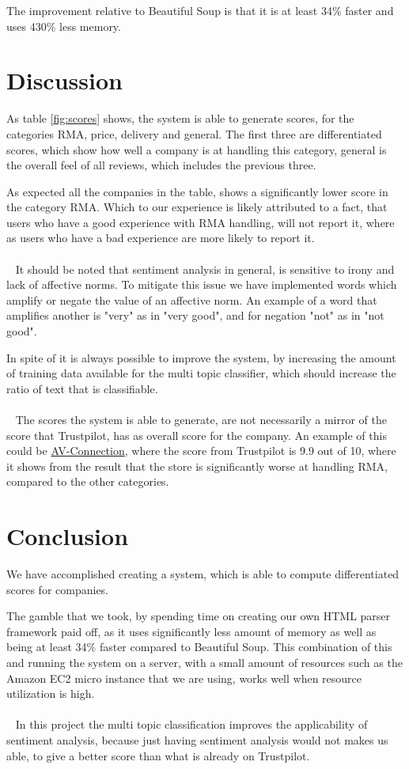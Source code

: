\documentclass[10pt]{IEEEtran}
\begin{document}
The improvement relative to Beautiful Soup is that it is at least {\color{green} 34\%} faster and uses {\color{green} 430\%} less memory.

\section{Discussion}
As table \ref{fig:scores} shows, the system is able to generate scores, for the categories RMA, price, delivery and general. The first three are differentiated scores, which show how well a company is at handling this category, general is the overall feel of all reviews, which includes the previous three.

As expected all the companies in the table, shows a significantly lower score in the category RMA. Which to our experience is likely attributed to a fact, that users who have a good experience with RMA handling, will not report it, where as users who have a bad experience are more likely to report it.
\\~
\\~
It should be noted that sentiment analysis in general, is sensitive to irony and lack of affective norms. To mitigate this issue we have implemented words which amplify or negate the value of an affective norm. An example of a word that amplifies another is "very" as in "very good", and for negation "not" as in "not good".

In spite of it is always possible to improve the system, by increasing the amount of training data available for the multi topic classifier, which should increase the ratio of text that is classifiable.
\\~
\\~
The scores the system is able to generate, are not necessarily a mirror of the score that Trustpilot, has as overall score for the company. An example of this could be \href{http://www.trustpilot.dk/review/www.av-connection.dk}{AV-Connection}, where the score from Trustpilot is 9.9 out of 10, where it shows from the result that the store is significantly worse at handling RMA, compared to the other categories. 

\section{Conclusion}
We have accomplished creating a system, which is able to compute differentiated scores for companies. 

The gamble that we took, by spending time on creating our own HTML parser framework paid off, as it uses significantly less amount of memory as well as being at least 34\% faster compared to Beautiful Soup. This combination of this and running the system on a server, with a small amount of resources such as the Amazon EC2 micro instance that we are using, works well when resource utilization is high.
\\~
\\~
In this project the multi topic classification improves the applicability of sentiment analysis, because just having sentiment analysis would not makes us able, to give a better score than what is already on Trustpilot.
\end{document}

